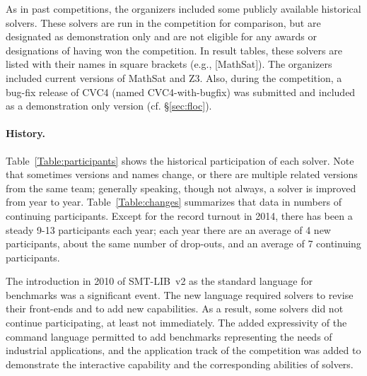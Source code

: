 \documentclass[twoside,11pt]{article}
\begin{document}
As in past competitions, the organizers included some publicly available historical solvers. These solvers are run in the competition for comparison, but are designated as demonstration only and are not eligible for any awards or designations of having won the competition. In result tables, these solvers are listed with their names in square brackets (e.g., [MathSat]). The organizers included current versions of MathSat and Z3. Also, during the competition, a bug-fix release of CVC4 (named CVC4-with-bugfix) was submitted and included as a demonstration only version (cf. \S\ref{sec:floc}).

\begin{table}
\caption{Changes in participation}
\label{Table:changes}
\centering
{}
\end{table}

\paragraph{History.} Table~\ref{Table:participants} shows the
 historical participation of each solver. Note that sometimes versions and names change, or there are multiple related versions from the same team; generally speaking, though not always, a solver is improved from year to year.
Table~\ref{Table:changes} summarizes that data in numbers of continuing participants. Except for the record turnout in
 2014, there has been a steady 9-13 participants each year; each year there are an average of 4 new
 participants, about the same number of drop-outs, and an average of 7 continuing participants.

The introduction in 2010 of SMT-LIB~v2 as the standard language for benchmarks was a significant event. The new language required solvers to revise their front-ends and to add new capabilities.
As a result, some solvers did not continue participating, at least not immediately. The added expressivity of the command language permitted to add benchmarks representing the needs of industrial applications, and 
the application track of the competition was added to demonstrate the interactive capability and the corresponding abilities of solvers.
\end{document}
